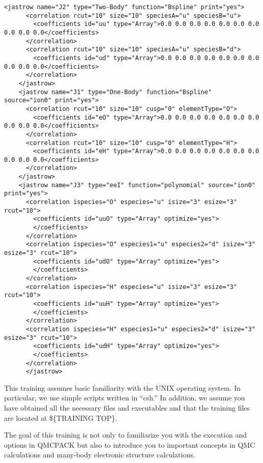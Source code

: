 \begin{lstlisting}[style=QMCPXML,caption=``Sample Jastrow XML block.",label=fig:lam_xml_jastrow]
<jastrow name="J2" type="Two-Body" function="Bspline" print="yes">
      <correlation rcut="10" size="10" speciesA="u" speciesB="u">
        <coefficients id="uu" type="Array">0.0 0.0 0.0 0.0 0.0 0.0 0.0 0.0 0.0 0.0</coefficients>
      </correlation>
      <correlation rcut="10" size="10" speciesA="u" speciesB="d">
        <coefficients id="ud" type="Array">0.0 0.0 0.0 0.0 0.0 0.0 0.0 0.0 0.0 0.0</coefficients>
      </correlation>
    </jastrow>
    <jastrow name="J1" type="One-Body" function="Bspline" source="ion0" print="yes">
      <correlation rcut="10" size="10" cusp="0" elementType="O">
        <coefficients id="eO" type="Array">0.0 0.0 0.0 0.0 0.0 0.0 0.0 0.0 0.0 0.0</coefficients>
      </correlation>
      <correlation rcut="10" size="10" cusp="0" elementType="H">
        <coefficients id="eH" type="Array">0.0 0.0 0.0 0.0 0.0 0.0 0.0 0.0 0.0 0.0</coefficients>
      </correlation>
    </jastrow>
    <jastrow name="J3" type="eeI" function="polynomial" source="ion0" print="yes">
      <correlation ispecies="O" especies="u" isize="3" esize="3" rcut="10">
        <coefficients id="uuO" type="Array" optimize="yes">
        </coefficients>
      </correlation>
      <correlation ispecies="O" especies1="u" especies2="d" isize="3" esize="3" rcut="10">
        <coefficients id="udO" type="Array" optimize="yes">
        </coefficients>
      </correlation>
      <correlation ispecies="H" especies="u" isize="3" esize="3" rcut="10">
        <coefficients id="uuH" type="Array" optimize="yes">
        </coefficients>
      </correlation>
      <correlation ispecies="H" especies1="u" especies2="d" isize="3" esize="3" rcut="10">
        <coefficients id="udH" type="Array" optimize="yes">
        </coefficients>
      </correlation>
      </jastrow>
\end{lstlisting}

This training assumes basic familiarity with the UNIX operating system. In particular,
we use simple scripts written in “csh.” In addition, we assume you have obtained
all the necessary files and executables and that the training files are located
at \$\{TRAINING TOP\}.

The goal of this training is not only to familiarize you with the execution and
options in QMCPACK but also to introduce you to important concepts in QMC calculations and many-body electronic structure calculations.



